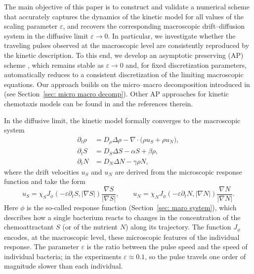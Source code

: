 \documentclass[11pt,twoside]{article}
\numberwithin{equation}{section}
\theoremstyle{plain}
\theoremstyle{nonumberplain}
\begin{document}
The main objective of this paper is to construct and validate a numerical scheme that accurately captures the dynamics of the kinetic model for all values of the scaling parameter $\varepsilon$, and recovers the corresponding macroscopic drift–diffusion system in the diffusive limit $\varepsilon\to0$. In particular, we investigate whether the traveling pulses observed at the macroscopic level are consistently reproduced by the kinetic description. To this end, we develop an asymptotic preserving (AP) scheme \cite{filbet2010class,jin1999efficient}, which remains stable as $\varepsilon\to0$ and, for fixed discretization parameters, automatically reduces to a consistent discretization of the limiting macroscopic equations. Our approach builds on the micro–macro decomposition introduced in \cite{lemou2008new} (see Section~\ref{sec: micro macro decomp}). Other AP approaches for kinetic chemotaxis models can be found in \cite{CY13,LWZ18,CKLO19} and the references therein.



In the diffusive limit, the kinetic model formally converges to the macroscopic system
\begin{subequations}
\label{basicmodel}
\begin{align}
\partial_t \rho
&= D_\rho \Delta \rho
   - \nabla \cdot \bigl( \rho u_S + \rho u_N \bigr), \\
\partial_t S
&= D_S \Delta S - \alpha S + \beta \rho, \\
\partial_t N
&= D_N \Delta N - \gamma \rho N,
\end{align}
\end{subequations}
where the drift velocities $u_S$ and $u_N$ are derived from the microscopic response function and take the form
\begin{equation}
\label{eq:flux_intro}
u_S
=
\chi_S J_\phi(-\varepsilon \partial_t S, |\nabla S|)
\frac{\nabla S}{|\nabla S|},
\qquad
u_N
=
\chi_N J_\phi(-\varepsilon \partial_t N, |\nabla N|)
\frac{\nabla N}{|\nabla N|}.
\end{equation}
 Here $\phi$ is the so-called response function
 (Section~\ref{sec: maro system}), which
describes how a single bacterium reacts to changes in the concentration of the
chemoattractant $S$ (or of the nutrient $N$) along its trajectory. The function $J_\phi$
encodes, at the macroscopic level, these microscopic features of the individual response.
The parameter $\varepsilon$ is the ratio between the pulse speed and the speed of individual
bacteria; in the experiments $\varepsilon \approx 0.1$, so the pulse travels one order of
magnitude slower than each individual.
\end{document}
